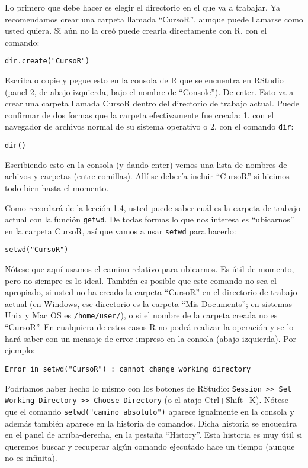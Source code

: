 \documentclass[]{article}
\begin{document}
Lo primero que debe hacer es elegir el directorio en el que va a
trabajar. Ya recomendamos crear una carpeta llamada ``CursoR'', aunque
puede llamarse como usted quiera. Si aún no la creó puede crearla
directamente con R, con el comando:

\begin{verbatim}
dir.create("CursoR")
\end{verbatim}
Escriba o copie y pegue esto en la consola de R que se encuentra en
RStudio (panel 2, de abajo-izquierda, bajo el nombre de ``Console''). De
enter. Esto va a crear una carpeta llamada CursoR dentro del directorio
de trabajo actual. Puede confirmar de dos formas que la carpeta
efectivamente fue creada: 1. con el navegador de archivos normal de su
sistema operativo o 2. con el comando \texttt{dir}:

\begin{verbatim}
dir()
\end{verbatim}
Escribiendo esto en la consola (y dando enter) vemos una lista de
nombres de achivos y carpetas (entre comillas). Allí se debería incluir
``CursoR'' si hicimos todo bien hasta el momento.

Como recordará de la lección 1.4, usted puede saber cuál es la carpeta
de trabajo actual con la función \texttt{getwd}. De todas formas lo que
nos interesa es ``ubicarnos'' en la carpeta CursoR, así que vamos a usar
\texttt{setwd} para hacerlo:

\begin{verbatim}
setwd("CursoR")
\end{verbatim}
Nótese que aquí usamos el camino relativo para ubicarnos. Es útil de
momento, pero no siempre es lo ideal. También es posible que este
comando no sea el apropiado, si usted no ha creado la carpeta ``CursoR''
en el directorio de trabajo actual (en Windows, ese directorio es la
carpeta ``Mis Documents''; en sistemas Unix y Mac OS es
\texttt{/home/user/}), o si el nombre de la carpeta creada no es
``CursoR''. En cualquiera de estos casos R no podrá realizar la
operación y se lo hará saber con un mensaje de error impreso en la
consola (abajo-izquierda). Por ejemplo:

\begin{verbatim}
Error in setwd("CursoR") : cannot change working directory
\end{verbatim}
Podríamos haber hecho lo mismo con los botones de RStudio:
\texttt{Session \textgreater{}\textgreater{} Set Working Directory \textgreater{}\textgreater{} Choose Directory}
(o el atajo Ctrl+Shift+K). Nótese que el comando
\texttt{setwd("camino absoluto")} aparece igualmente en la consola y
además también aparece en la historia de comandos. Dicha historia se
encuentra en el panel de arriba-derecha, en la pestaña ``History''. Esta
historia es muy útil si queremos buscar y recuperar algún comando
ejecutado hace un tiempo (aunque no es infinita).
\end{document}
